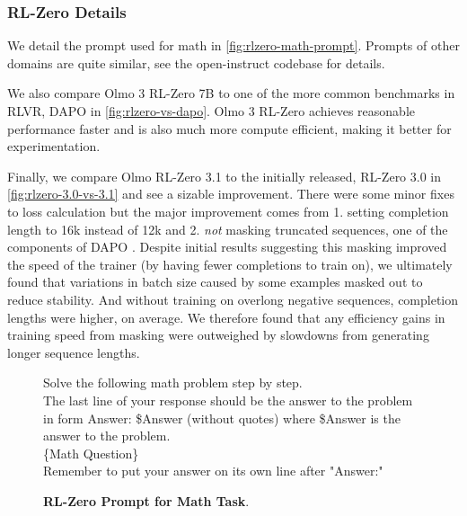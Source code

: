 \documentclass[table]{ai2style/ai2}
\begin{document}
{{\subsubsection{RL-Zero Details}
\label{ssub:rl-zero}
We detail the prompt used for math in \autoref{fig:rlzero-math-prompt}. Prompts of other domains are quite similar, see the open-instruct codebase for details.

We also compare Olmo 3 RL-Zero 7B to one of the more common benchmarks in RLVR, DAPO \citep{yu2025dapo} in \autoref{fig:rlzero-vs-dapo}. Olmo 3 RL-Zero achieves reasonable performance faster and is also much more compute efficient, making it better for experimentation.

Finally, we compare Olmo RL-Zero 3.1 to the initially released, RL-Zero 3.0 in \autoref{fig:rlzero-3.0-vs-3.1} and see a sizable improvement. There were some minor fixes to loss calculation but the major improvement comes from 1. setting completion length to 16k instead of 12k and 2. \textit{not} masking truncated sequences, one of the components of DAPO \citep{yu2025dapo}. Despite initial results suggesting this masking improved the speed of the trainer (by having fewer completions to train on), we ultimately found that variations in batch size caused by some examples masked out to reduce stability. And without training on overlong negative sequences, completion lengths were higher, on average. We therefore found that any efficiency gains in training speed from masking were outweighed by slowdowns from generating longer sequence lengths. 

\begin{figure}[h]
\begin{prompt}{}\small
Solve the following math problem step by step. \\
The last line of your response should be the answer to the problem in form Answer: \$Answer (without quotes) where \$Answer is the answer to the problem.\\

\{Math Question\}\\

Remember to put your answer on its own line after "Answer:"
\end{prompt}
\caption{\textbf{RL-Zero Prompt for Math Task}.}
\label{fig:rlzero-math-prompt}
\end{figure}

}}
\end{document}

